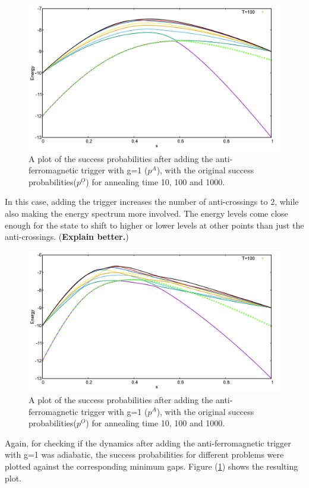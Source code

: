 \documentclass[12]{article}
\begin{document}
\begin{figure}[H]
\centering 
\includegraphics[scale=0.3]{969_O_T100.png}
\caption{A plot of the success probabilities after adding the anti-ferromagnetic trigger with g=1 ($p^A$), with the original success probabilities($p^O$) for annealing time 10, 100 and 1000.}
\label{fig:a30}
\end{figure}
In this case, adding the trigger increases the number of anti-crossings to 2, while also making the energy spectrum more involved. The energy levels come close enough for the state to shift to higher or lower levels at other points than just the anti-crossings. (\textbf{Explain better.})
\begin{figure}[H]
\centering 
\includegraphics[scale=0.3]{969_A_T100_g1.png}
\caption{A plot of the success probabilities after adding the anti-ferromagnetic trigger with g=1 ($p^A$), with the original success probabilities($p^O$) for annealing time 10, 100 and 1000.}
\label{fig:a31}
\end{figure}

Again, for checking if the dynamics after adding the anti-ferromagnetic trigger with g=1 was adiabatic, the success probabilities for different problems were plotted against the corresponding minimum gaps. Figure (\ref{fig:a30}) shows the resulting plot.
\end{document}

